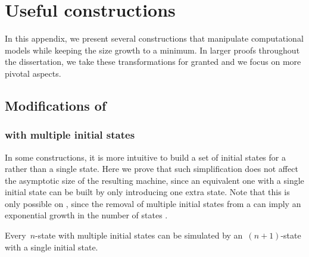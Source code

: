 \chapter{Useful constructions}\label{app:constructions}
In this appendix, we present several constructions that manipulate computational models while keeping the size growth to a minimum.
In larger proofs throughout the dissertation, we take these transformations for granted and we focus on more pivotal aspects.



\section{Modifications of \texorpdfstring{\ONFAs}{1NFAs}}


\subsection{\texorpdfstring{\ONFAs}{1NFAs} with multiple initial states}\label{sub:multistart}
In some constructions, it is more intuitive to build a set of initial states for a \ONFA rather than a single state.
Here we prove that such simplification does not affect the asymptotic size of the resulting machine, since an equivalent one with a single initial state can be built by only introducing one extra state.
Note that this is only possible on \ONFAs, since the removal of multiple initial states from a \ODFA can imply an exponential growth in the number of states \cite{HolSal+01}.
\begin{thrm}\label{thm:mult-start-states}
	Every~$n$-state \ONFA with multiple initial states can be simulated by an~$(n+1)$-state \ONFA with a single initial state.
\end{thrm}

